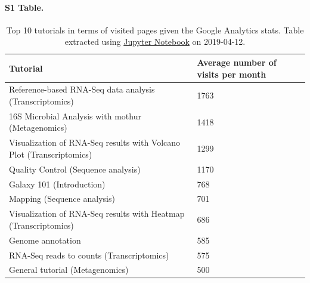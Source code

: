 \documentclass[10pt,letterpaper]{article}
\begin{document}
\paragraph*{S1 Table.}
\label{S1_Table}
\begin{table}[]
\begin{adjustwidth}{-2.25in}{0in} %
	\centering
	\caption{Top 10 tutorials in terms of visited pages given the Google Analytics stats. Table extracted using \href{https://github.com/bebatut/galaxy-training-material-stats/blob/master/src/extract_repo_content_stats.ipynb}{Jupyter Notebook} on 2019-04-12.\label{tbl:topViewedTutorials}}
	\begin{tabular}{ll}
		Tutorial                                                             & Average number of visits per month \\\hline
		Reference-based RNA-Seq data analysis (Transcriptomics)              & 1763 \\
		16S Microbial Analysis with mothur (Metagenomics)                    & 1418 \\
		Visualization of RNA-Seq results with Volcano Plot (Transcriptomics) & 1299 \\
		Quality Control (Sequence analysis)                                  & 1170 \\
		Galaxy 101 (Introduction)                                            & 768 \\
		Mapping (Sequence analysis)                                          & 701 \\
		Visualization of RNA-Seq results with Heatmap (Transcriptomics)      & 686 \\
		Genome annotation                                                    & 585 \\
		RNA-Seq reads to counts (Transcriptomics)                            & 575 \\
		General tutorial (Metagenomics)                                      & 500 \\
	\end{tabular}
\end{adjustwidth}
\end{table}
\end{document}

